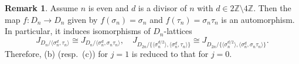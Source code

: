\documentclass[12pt]{amsart}
\theoremstyle{plain}
\theoremstyle{definition}
\newtheorem{rem}[thm]{Remark}
\numberwithin{thm}{section}
\numberwithin{equation}{section}
\newcommand{\Z}{\mathbb{Z}}
\begin{document}
\begin{rem}
Assume $n$ is even and $d$ is a divisor of $n$ with $d\in 2\Z \setminus 4\Z$. Then the map $f\colon D_{n}\rightarrow D_{n}$ given by $f(\sigma_{n})=\sigma_{n}$ and $f(\tau_{n})=\sigma_{n}\tau_{n}$ is an automorphism. In particular, it induces isomorphisms of $D_{n}$-lattices
\begin{equation*}
    J_{D_{n}/\langle \sigma_{n}^{d},\tau_{n}\rangle}\cong J_{D_{n}/\langle \sigma_{n}^{d},\sigma_{n}\tau_{n}\rangle},\quad 
    J_{D_{2n}/\{\langle \sigma_{n}^{d/2} \rangle,\langle \sigma_{n}^{d},\tau_{n} \rangle\}}\cong 
    J_{D_{2n}/\{\langle \sigma_{n}^{d/2} \rangle,\langle \sigma_{n}^{d},\sigma_{n}\tau_{n} \rangle\}}. 
\end{equation*}
Therefore, (b) (resp.~(c)) for $j=1$ is reduced to that for $j=0$. 
\end{rem}
\end{document}
